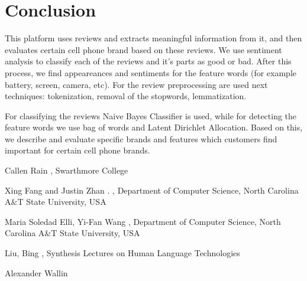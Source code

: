 \documentclass[11pt]{article}
\begin{document}
\section{Conclusion}
This platform uses reviews and extracts meaningful information from it, and then evaluates certain cell phone brand based on these reviews. We use sentiment analysis to classify each of the reviews and it's parts as good or bad. After this process, we find appeareances and sentiments for the feature words (for example battery, screen, camera, etc). For the review preprocessing are used next techniques: tokenization, removal of the stopwords, lemmatization. \par

For classifying the reviews Naive Bayes Classifier is used, while for detecting the feature words we use bag of words and Latent Dirichlet Allocation. Based on this, we describe and evaluate specific brands and features which customers find important for certain cell phone brands.  


\begin{thebibliography}{}

Callen Rain
,
\newblock Swarthmore College


Xing Fang and Justin Zhan
.
,
\newblock Department of Computer Science, North Carolina A\&T State University, USA


Maria Soledad Elli, Yi-Fan Wang
,
\newblock Department of Computer Science, North Carolina A\&T State University, USA


Liu, Bing
,
\newblock Synthesis Lectures on Human Language Technologies


Alexander Wallin




\end{thebibliography}
\end{document}
